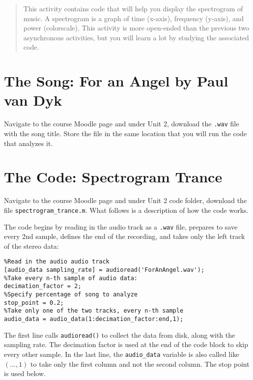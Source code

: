 \documentclass[12pt]{article}
\begin{document}
\maketitle

\begin{abstract}
This activity contains code that will help you display the spectrogram of music.  A spectrogram is a graph of time (x-axis), frequency (y-axis), and power (colorscale).  This activity is more open-ended than the previous two asynchronous activities, but you will learn a lot by studying the associated code.
\end{abstract}

\section{The Song: For an Angel by Paul van Dyk}

Navigate to the course Moodle page and under Unit 2, download the \verb+.wav+ file with the song title.  Store the file in the same location that you will run the code that analyzes it.

\section{The Code: Spectrogram Trance}

Navigate to the course Moodle page and under Unit 2 code folder, download the file \verb+spectrogram_trance.m+.  What follows is a description of how the code works.

The code begins by reading in the audio track as a \verb+.wav+ file, prepares to save every 2nd sample, defines the end of the recording, and takes only the left track of the stereo data:

\begin{verbatim}
%Read in the audio audio track
[audio_data sampling_rate] = audioread('ForAnAngel.wav');
%Take every n-th sample of audio data:
decimation_factor = 2;
%Specify percentage of song to analyze
stop_point = 0.2;
%Take only one of the two tracks, every n-th sample
audio_data = audio_data(1:decimation_factor:end,1);
\end{verbatim}

The first line calls \verb+audioread()+ to collect the data from disk, along with the sampling rate. The decimation factor is used at the end of the code block to skip every other sample.  In the last line, the \verb+audio_data+ variable is also called like $(..., 1)$ to take only the first column and not the second column.  The stop point is used below.
\end{document}
